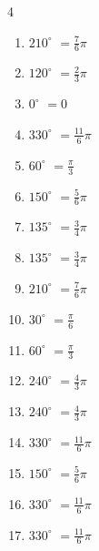 \begin{multicols}{4}
\begin{enumerate}
  \item $\displaystyle 210^{\circ}$
        $\displaystyle =\frac{7}{6}\pi$

  \item $\displaystyle 120^{\circ}$
        $\displaystyle =\frac{2}{3}\pi$

  \item $\displaystyle 0^{\circ}$
        $\displaystyle =0$

  \item $\displaystyle 330^{\circ}$
        $\displaystyle =\frac{11}{6}\pi$

  \item $\displaystyle 60^{\circ}$
        $\displaystyle =\frac{\pi}{3}$

  \item $\displaystyle 150^{\circ}$
        $\displaystyle =\frac{5}{6}\pi$

  \item $\displaystyle 135^{\circ}$
        $\displaystyle =\frac{3}{4}\pi$

  \item $\displaystyle 135^{\circ}$
        $\displaystyle =\frac{3}{4}\pi$

  \item $\displaystyle 210^{\circ}$
        $\displaystyle =\frac{7}{6}\pi$

  \item $\displaystyle 30^{\circ}$
        $\displaystyle =\frac{\pi}{6}$

  \item $\displaystyle 60^{\circ}$
        $\displaystyle =\frac{\pi}{3}$

  \item $\displaystyle 240^{\circ}$
        $\displaystyle =\frac{4}{3}\pi$

  \item $\displaystyle 240^{\circ}$
        $\displaystyle =\frac{4}{3}\pi$

  \item $\displaystyle 330^{\circ}$
        $\displaystyle =\frac{11}{6}\pi$

  \item $\displaystyle 150^{\circ}$
        $\displaystyle =\frac{5}{6}\pi$

  \item $\displaystyle 330^{\circ}$
        $\displaystyle =\frac{11}{6}\pi$

  \item $\displaystyle 330^{\circ}$
        $\displaystyle =\frac{11}{6}\pi$


\end{enumerate}
\end{multicols}
